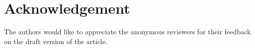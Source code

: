 \documentclass[preprint,12pt,3p]{elsarticle}
\begin{document}
\section*{Acknowledgement}

 The authors would like to appreciate the anonymous reviewers for their feedback on the draft version of the article.
 
\pagebreak



%

%
%
% 
%
% 
%
% 
% 
% 
% 
%
%
%




\pagebreak

\appendix
\end{document}

